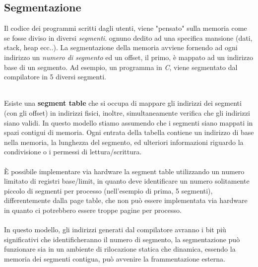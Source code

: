 \documentclass[12pt, letterpaper]{article}
\newcommand{\acc}{\\\hphantom{}\\}
\begin{document}
\subsection{Segmentazione}
Il codice dei programmi scritti dagli utenti, viene "pensato" sulla memoria come se fosse diviso in diversi 
\textit{segmenti}. ognuno dedito ad una specifica mansione (dati, stack, heap ecc..). La segmentazione della memoria 
avviene fornendo ad ogni indirizzo un \textit{numero di segmento} ed un 
offset, il primo, è mappato ad un indirizzo base di un segmento. Ad esempio, un programma in \textit{C}, viene 
segmentato dal compilatore in 5 diversi segmenti.
\begin{figure}[h]
\end{figure}\\
Esiste una \textbf{segment table} che si occupa di mappare gli indirizzi dei segmenti (con gli offset) in indirizzi 
fisici, inoltre, simultaneamente verifica che gli indirizzi siano validi. In questo modello stiamo assumendo che i segmenti 
siano mappati in spazi contigui di memoria. Ogni entrata della tabella contiene un indirizzo di base nella memoria, la lunghezza 
del segmento, ed ulteriori informazioni riguardo la condivisione o i permessi di lettura/scrittura. \acc È possibile 
implementare via hardware la segment table utilizzando un numero limitato di registri base/limit, in quanto deve 
identificare un numero solitamente piccolo di segmenti per processo (nell'esempio di prima, 5 segmenti), differentemente 
dalla page table, che non può essere implementata via hardware in quanto ci potrebbero essere troppe pagine per 
processo.\acc 
In questo modello, gli indirizzi generati dal compilatore avranno i bit più significativi che identificheranno il numero 
di segmento, la segmentazione può funzionare sia in un ambiente di rilocazione statica che dinamica, essendo la memoria 
dei segmenti contigua, può avvenire la frammentazione esterna.
\end{document}

